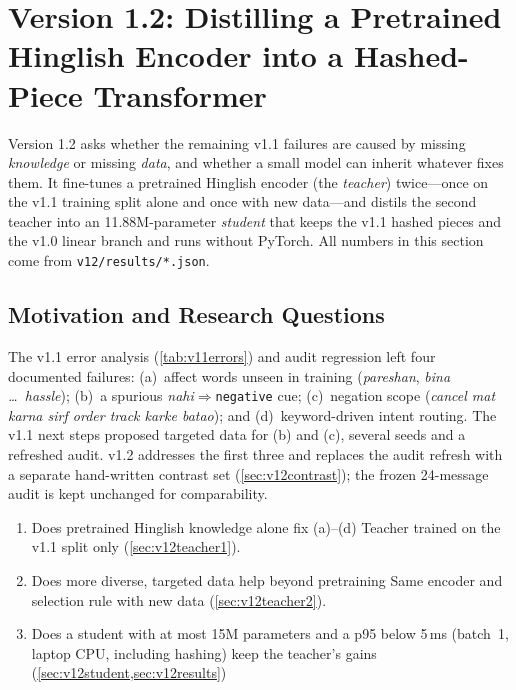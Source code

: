 \documentclass[11pt,a4paper]{article}
\theoremstyle{remark}
\newcommand{\lbl}[1]{\texttt{#1}}                      %
\newcommand{\hi}[1]{\textit{#1}}                       %
\begin{document}
\section{Version 1.2: Distilling a Pretrained Hinglish Encoder into a Hashed-Piece Transformer}
\label{sec:v12}

Version 1.2 asks whether the remaining v1.1 failures are caused by missing
\emph{knowledge} or missing \emph{data}, and whether a small model can inherit
whatever fixes them. It fine-tunes a pretrained Hinglish encoder (the
\emph{teacher}) twice---once on the v1.1 training split alone and once with new
data---and distils the second teacher into an 11.88M-parameter \emph{student}
that keeps the v1.1 hashed pieces and the v1.0 linear branch and runs without
PyTorch. All numbers in this section come from \texttt{v12/results/*.json}.

\subsection{Motivation and Research Questions}
\label{sec:v12motivation}

The v1.1 error analysis (\cref{tab:v11errors}) and audit regression left four
documented failures: (a)~affect words unseen in training (\hi{pareshan},
\hi{bina \dots\ hassle}); (b)~a spurious \hi{nahi}$\Rightarrow$\lbl{negative}
cue; (c)~negation scope (\hi{cancel mat karna sirf order track karke batao});
and (d)~keyword-driven intent routing. The v1.1 next steps proposed targeted
data for (b) and (c), several seeds and a refreshed audit. v1.2 addresses the
first three and replaces the audit refresh with a separate hand-written
contrast set (\cref{sec:v12contrast}); the frozen 24-message audit is kept
unchanged for comparability.

\begin{enumerate}
  \item[\textbf{Q1}] Does pretrained Hinglish knowledge alone fix (a)--(d) Teacher trained on the v1.1 split only (\cref{sec:v12teacher1}).
  \item[\textbf{Q2}] Does more diverse, targeted data help beyond pretraining Same encoder and selection rule with new data (\cref{sec:v12teacher2}).
  \item[\textbf{Q3}] Does a student with at most 15M parameters and a p95 below 5\,ms (batch~1, laptop CPU, including hashing) keep the teacher's gains (\cref{sec:v12student,sec:v12results})
\end{enumerate}
\end{document}
